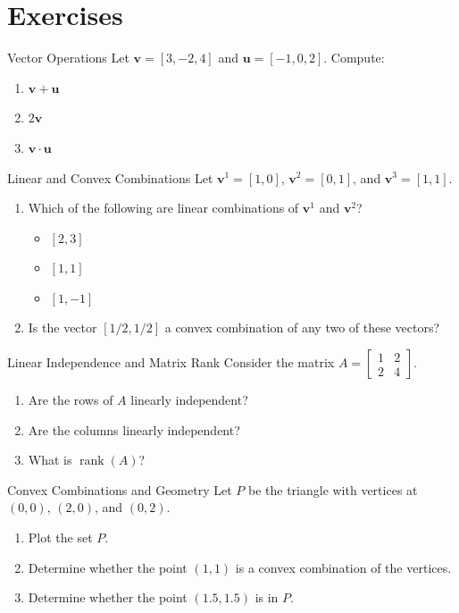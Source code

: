 \section{Exercises}

\begin{ex}{Vector Operations}{}
Let \( \mathbf{v} = [3, -2, 4] \) and \( \mathbf{u} = [-1, 0, 2] \). Compute:
\begin{enumerate}
    \item \( \mathbf{v} + \mathbf{u} \)
    \item \( 2\mathbf{v} \)
    \item \( \mathbf{v} \cdot \mathbf{u} \)
\end{enumerate}
\end{ex}

\begin{ex}{Linear and Convex Combinations}{}
Let \( \mathbf{v}^1 = [1, 0] \), \( \mathbf{v}^2 = [0, 1] \), and \( \mathbf{v}^3 = [1, 1] \).

\begin{enumerate}
    \item Which of the following are linear combinations of \( \mathbf{v}^1 \) and \( \mathbf{v}^2 \)?  
    \begin{itemize}
        \item[(a)] \( [2, 3] \)  
        \item[(b)] \( [1, 1] \)  
        \item[(c)] \( [1, -1] \)
    \end{itemize}
    \item Is the vector \( [1/2, 1/2] \) a convex combination of any two of these vectors?
\end{enumerate}
\end{ex}
\begin{ex}{Linear Independence and Matrix Rank}{}
Consider the matrix \( A = \begin{bmatrix} 1 & 2 \\ 2 & 4 \end{bmatrix} \).
\begin{enumerate}
    \item Are the rows of \( A \) linearly independent?
    \item Are the columns linearly independent?
    \item What is \( \operatorname{rank}(A) \)?
\end{enumerate}
\end{ex}

\begin{ex}{Convex Combinations and Geometry}{}
Let \( P \) be the triangle with vertices at \( (0,0) \), \( (2,0) \), and \( (0,2) \).  
\begin{enumerate}
    \item Plot the set \( P \).
    \item Determine whether the point \( (1,1) \) is a convex combination of the vertices.
    \item Determine whether the point \( (1.5,1.5) \) is in \( P \).
\end{enumerate}
\end{ex}

